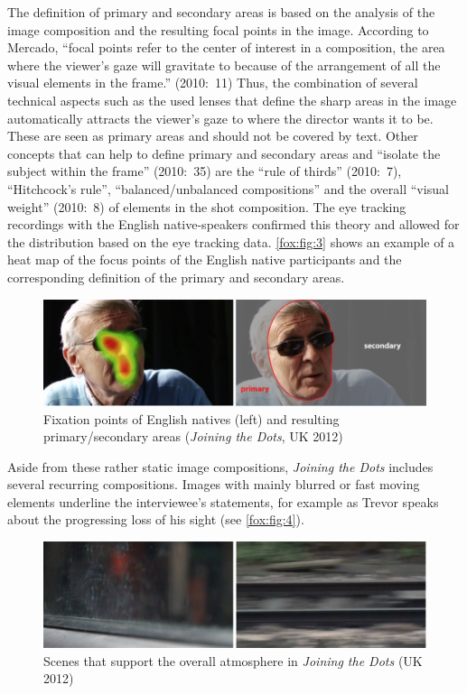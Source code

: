 \documentclass[output=paper]{langsci/langscibook}
\begin{document}
The definition of primary and secondary areas is based on the analysis of the image composition and the resulting focal points in the image. According to Mercado, ``focal points refer to the center of interest in a composition, the area where the viewer's gaze will gravitate to because of the arrangement of all the visual elements in the frame.'' (2010:~11) Thus, the combination of several technical aspects such as the used lenses that define the sharp areas in the image automatically attracts the viewer's gaze to where the director wants it to be. These are seen as primary areas and should not be covered by text. Other concepts that can help to define primary and secondary areas and ``isolate the subject within the frame'' (2010:~35) are the ``rule of thirds'' (2010:~7), ``Hitchcock's rule'', ``balanced/unbalanced compositions'' and the overall ``visual weight'' (2010:~8) of elements in the shot composition. The eye tracking recordings with the English native-speakers confirmed this theory and allowed for the distribution based on the eye tracking data. \autoref{fox:fig:3} shows an example of a heat map of the focus points of the English native participants and the corresponding definition of the primary and secondary areas.


\begin{figure}
 \includegraphics[width=\textwidth]{figures/Fox3.png}
 \caption{Fixation points of English natives (left) and resulting primary/secondary areas (\textit{Joining the Dots}, UK 2012)}
 \label{fox:fig:3}
\end{figure}  



Aside from these rather static image compositions, \textit{Joining the Dots} includes several recurring compositions. Images with mainly blurred or fast moving elements underline the interviewee's statements, for example as Trevor speaks about the progressing loss of his sight (see \autoref{fox:fig:4}).


\begin{figure}
 \includegraphics[width=\textwidth]{figures/Fox4.png}
 \caption{Scenes that support the overall atmosphere in \textit{Joining the Dots} (UK 2012)}
 \label{fox:fig:4}
\end{figure} 
\end{document}
